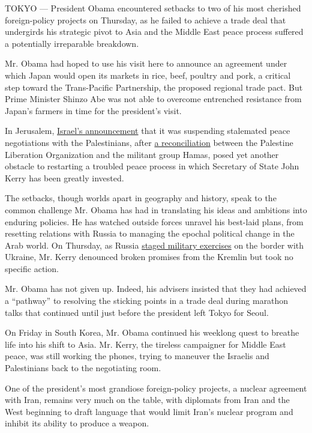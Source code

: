 TOKYO --- President Obama encountered setbacks to two of his most
cherished foreign-policy projects on Thursday, as he failed to achieve a
trade deal that undergirds his strategic pivot to Asia and the Middle
East peace process suffered a potentially irreparable breakdown.

Mr. Obama had hoped to use his visit here to announce an agreement under
which Japan would open its markets in rice, beef, poultry and pork, a
critical step toward the Trans-Pacific Partnership, the proposed
regional trade pact. But Prime Minister Shinzo Abe was not able to
overcome entrenched resistance from Japan's farmers in time for the
president's visit.

In Jerusalem,
\href{http://www.nytimes.com/2014/04/25/world/middleeast/israel.html}{Israel's
announcement} that it was suspending stalemated peace negotiations with
the Palestinians, after
\href{http://www.nytimes.com/2014/04/24/world/middleeast/palestinian-factions-announce-deal-on-unity-government.html}{a
reconciliation} between the Palestine Liberation Organization and the
militant group Hamas, posed yet another obstacle to restarting a
troubled peace process in which Secretary of State John Kerry has been
greatly invested.

The setbacks, though worlds apart in geography and history, speak to the
common challenge Mr. Obama has had in translating his ideas and
ambitions into enduring policies. He has watched outside forces unravel
his best-laid plans, from resetting relations with Russia to managing
the epochal political change in the Arab world. On Thursday, as Russia
\href{http://www.nytimes.com/2014/04/25/world/europe/ukraine-crisis.html}{staged
military exercises} on the border with Ukraine, Mr. Kerry denounced
broken promises from the Kremlin but took no specific action.

Mr. Obama has not given up. Indeed, his advisers insisted that they had
achieved a ``pathway'' to resolving the sticking points in a trade deal
during marathon talks that continued until just before the president
left Tokyo for Seoul.

On Friday in South Korea, Mr. Obama continued his weeklong quest to
breathe life into his shift to Asia. Mr. Kerry, the tireless campaigner
for Middle East peace, was still working the phones, trying to maneuver
the Israelis and Palestinians back to the negotiating room.

One of the president's most grandiose foreign-policy projects, a nuclear
agreement with Iran, remains very much on the table, with diplomats from
Iran and the West beginning to draft language that would limit Iran's
nuclear program and inhibit its ability to produce a weapon.

